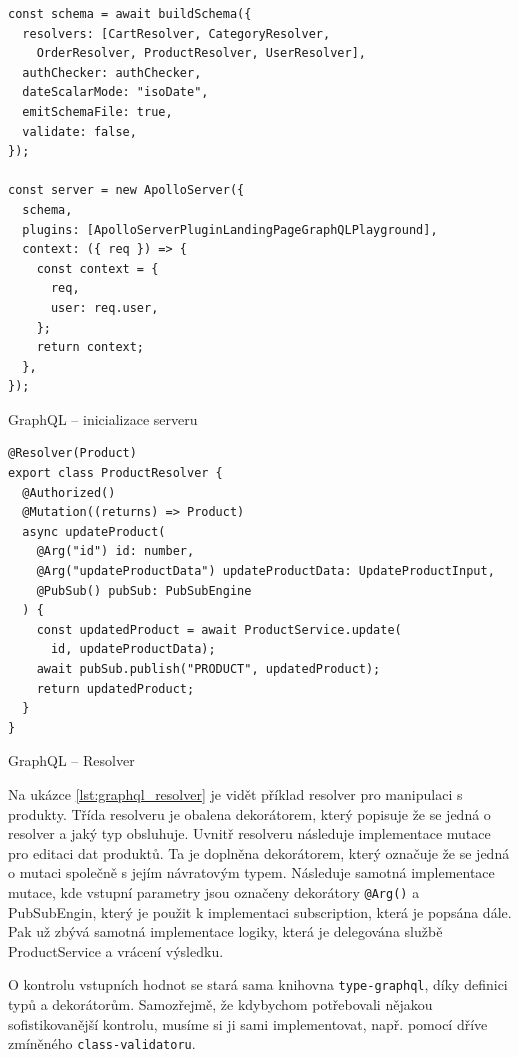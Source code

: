 \documentclass[thesis=M,czech]{FITthesis}[2019/12/23]
\begin{document}
\begin{listing}
\begin{verbatim}
const schema = await buildSchema({
  resolvers: [CartResolver, CategoryResolver,
    OrderResolver, ProductResolver, UserResolver],
  authChecker: authChecker,
  dateScalarMode: "isoDate",
  emitSchemaFile: true,
  validate: false,
});

const server = new ApolloServer({
  schema,
  plugins: [ApolloServerPluginLandingPageGraphQLPlayground],
  context: ({ req }) => {
    const context = {
      req,
      user: req.user,
    };
    return context;
  },
});
\end{verbatim}
\caption{GraphQL -- inicializace serveru}
\label{lst:example}
\end{listing}

\begin{listing}[H]
\begin{verbatim}
@Resolver(Product)
export class ProductResolver {
  @Authorized()
  @Mutation((returns) => Product)
  async updateProduct(
    @Arg("id") id: number,
    @Arg("updateProductData") updateProductData: UpdateProductInput,
    @PubSub() pubSub: PubSubEngine
  ) {
    const updatedProduct = await ProductService.update(
      id, updateProductData);
    await pubSub.publish("PRODUCT", updatedProduct);
    return updatedProduct;
  }
}
\end{verbatim}
\caption{GraphQL -- Resolver}
\label{lst:graphql_resolver}
\end{listing}

Na ukázce \ref{lst:graphql_resolver} je vidět příklad resolver pro manipulaci s produkty. Třída resolveru je obalena dekorátorem, který popisuje že se jedná o resolver a jaký typ obsluhuje. Uvnitř resolveru následuje implementace mutace pro editaci dat produktů. Ta je doplněna dekorátorem, který označuje že se jedná o mutaci společně s jejím návratovým typem. Následuje samotná implementace mutace, kde vstupní parametry jsou označeny dekorátory \texttt{@Arg()} a PubSubEngin, který je použit k implementaci subscription, která je popsána dále. Pak už zbývá samotná implementace logiky, která je delegována službě ProductService a vrácení výsledku.

O kontrolu vstupních hodnot se stará sama knihovna \texttt{type-graphql}, díky definici typů a dekorátorům. Samozřejmě, že kdybychom potřebovali nějakou sofistikovanější kontrolu, musíme si ji sami implementovat, např. pomocí dříve zmíněného \texttt{class-validatoru}. 
\end{document}
